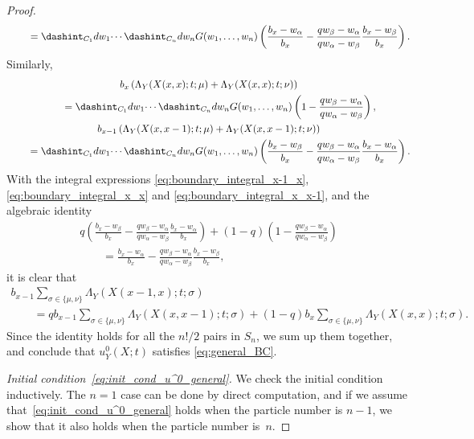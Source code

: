 \begin{proof}
\begin{gather}
 \qquad {}=   \dashint_{C_1} dw_1 \dotsi \dashint_{C_n} dw_n G(w_1, \dotsc, w_n) \left( \frac{b_x - w_{\alpha}}{b_x} - \frac{qw_{\beta} - w_{\alpha}}{qw_{\alpha} - w_{\beta}} \frac{b_x - w_{\beta}}{b_x} \right).
\label{eq:boundary_integral_x-1_x}
 \end{gather}
 Similarly,
 \begin{gather}
 b_x \left( \Lambda_Y(X(x, x); t; \mu) + \Lambda_Y(X(x, x); t; \nu) \right) \nonumber\\
 \qquad{}{} = \dashint_{C_1} dw_1 \dotsi \dashint_{C_n} dw_n G(w_1, \dotsc, w_n) \left( 1 - \frac{qw_{\beta} - w_{\alpha}}{qw_{\alpha} - w_{\beta}} \right), \label{eq:boundary_integral_x_x}
 \\
 b_{x - 1} \left( \Lambda_Y(X(x, x - 1); t; \mu) + \Lambda_Y(X(x, x - 1); t; \nu) \right) \nonumber\\
 \qquad{} = \dashint_{C_1} dw_1 \dotsi \dashint_{C_n} dw_n G(w_1, \dotsc, w_n)
  \left( \frac{b_x - w_{\beta}}{b_x} - \frac{qw_{\beta} - w_{\alpha}}{qw_{\alpha} - w_{\beta}} \frac{b_x - w_{\alpha}}{b_x} \right).\label{eq:boundary_integral_x_x-1}
 \end{gather}
 With the integral expressions \eqref{eq:boundary_integral_x-1_x}, \eqref{eq:boundary_integral_x_x} and \eqref{eq:boundary_integral_x_x-1}, and the algebraic identity
 \begin{gather*}
 q \left( \frac{b_x - w_{\beta}}{b_x} - \frac{qw_{\beta} - w_{\alpha}}{qw_{\alpha} - w_{\beta}} \frac{b_x - w_{\alpha}}{b_x} \right) + (1 - q) \left( 1 - \frac{qw_{\beta} - w_{\alpha}}{qw_{\alpha} - w_{\beta}} \right) \\
 \qquad{} = \frac{b_x - w_{\alpha}}{b_x} - \frac{qw_{\beta} - w_{\alpha}}{qw_{\alpha} - w_{\beta}} \frac{b_x - w_{\beta}}{b_x},
 \end{gather*}
 it is clear that
 \begin{gather*}
 b_{x - 1} \sum_{\sigma \in \{ \mu, \nu \}} \Lambda_Y(X(x - 1, x); t; \sigma)   \\
 \qquad{} = q b_{x - 1} \sum_{\sigma \in \{ \mu, \nu \}} \Lambda_Y(X(x, x - 1); t; \sigma) + (1 - q) b_x \sum_{\sigma \in \{ \mu, \nu \}} \Lambda_Y(X(x, x); t; \sigma).
 \end{gather*}
 Since the identity holds for all the $n!/2$ pairs in $S_n$, we sum up them together, and conclude that $u^0_Y(X; t)$ satisf\/ies \eqref{eq:general_BC}.

\textit{Initial condition~\eqref{eq:init_cond_u^0_general}.}
 We check the initial condition inductively. The $n = 1$ case can be done by direct computation, and if we assume that~\eqref{eq:init_cond_u^0_general} holds when the particle number is $n - 1$, we show that it also holds when the particle number is~$n$.


\end{proof}
